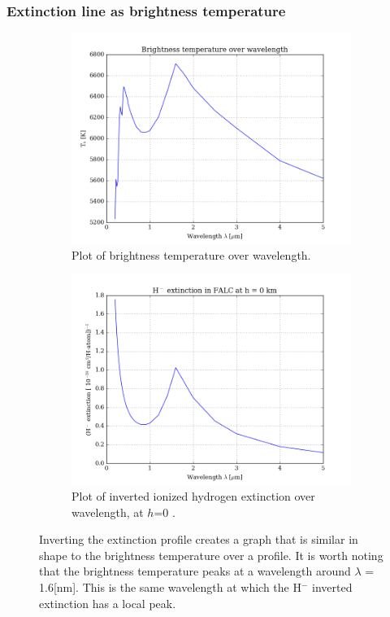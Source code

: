 \documentclass[11pt,a4paper,notitlepage]{article}
\begin{document}
\subsubsection{Extinction line as brightness temperature}
\begin{figure}[H]
\center

	\begin{subfigure}{0.49\textwidth}
	\includegraphics[scale=0.42]{../figs/2obs_Tb.png}
	\caption{Plot of brightness temperature over wavelength.}
	\end{subfigure}
	\hfill
	\begin{subfigure}{0.49\textwidth}
	\includegraphics[scale=0.42]{../figs/2cont_ext_Tb.png}
	\caption{Plot of inverted ionized hydrogen extinction over wavelength, at $h$=0 .}
	\end{subfigure}

\caption{Inverting the extinction profile creates a graph that is similar in shape to the brightness temperature over a profile. It is worth noting that the brightness temperature peaks at a wavelength around $\lambda$ = 1.6[nm]. This is the same wavelength at which the H$^-$ inverted extinction has a local peak.}
\end{figure}
\end{document}

